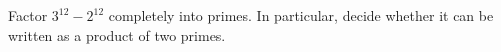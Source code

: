 Factor $3^{12}-2^{12}$ completely into primes. In particular, decide whether it can be written as a product of two primes.
